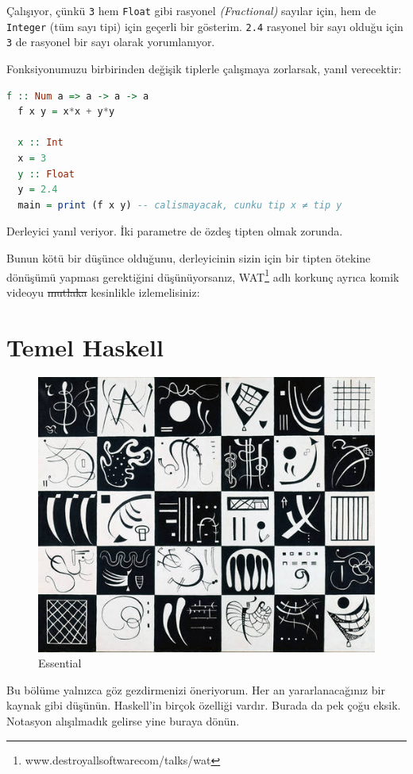 \documentclass[a4paper,14pt,openany]{extbook} %
\let\emph\textit
\begin{document}
Çalışıyor, çünkü \lstinline!3! hem \lstinline!Float! gibi rasyonel
\emph{(Fractional)} sayılar için, hem de \lstinline!Integer! (tüm sayı
tipi) için geçerli bir gösterim. \lstinline!2.4! rasyonel bir sayı olduğu
için \lstinline!3! de rasyonel bir sayı olarak yorumlanıyor.

Fonksiyonumuzu birbirinden değişik tiplerle çalışmaya zorlarsak, yanıl
verecektir:

\begin{lstlisting}[language=Haskell]
  f :: Num a => a -> a -> a
  f x y = x*x + y*y

  x :: Int
  x = 3
  y :: Float
  y = 2.4
  main = print (f x y) -- calismayacak, cunku tip x ≠ tip y
\end{lstlisting}

Derleyici yanıl veriyor. İki parametre de özdeş tipten olmak zorunda.

Bunun kötü bir düşünce olduğunu, derleyicinin sizin için bir tipten
ötekine dönüşümü yapması gerektiğini düşünüyorsanız, WAT\footnote{www.destroyallsoftware\centerdot com/talks/wat} adlı korkunç ayrıca komik videoyu \st{mutlaka} kesinlikle izlemelisiniz:

\pagebreak
\section{Temel Haskell}\label{temel-haskell}

\begin{figure}[htbp]
  \centering
  \includegraphics[width=0.6\linewidth]{img/kandinsky_gugg.jpg}
  \caption{Essential}
\end{figure}

Bu bölüme yalnızca göz gezdirmenizi öneriyorum. Her an
yararlanacağınız bir kaynak gibi düşünün. Haskell'in birçok özelliği
vardır. Burada da pek çoğu eksik. Notasyon alışılmadık %
gelirse yine buraya dönün.
\end{document}
